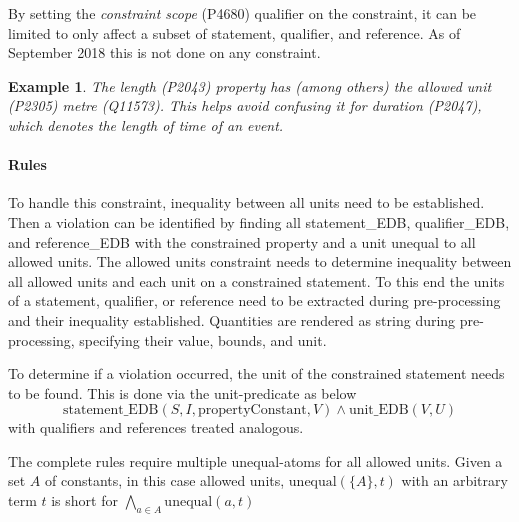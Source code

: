 \documentclass[hyperref,bachelorofscience,fleqn]{cgvpub}
\newtheorem{example}{Example}
\begin{document}
By setting the \emph{constraint scope} (P4680) qualifier on the constraint, it can be limited to only affect a subset of statement, qualifier, and reference. As of September 2018 this is not done on any constraint.

\begin{example}
The \emph{length} (P2043) property has (among others) the \emph{allowed unit} (P2305) \emph{metre} (Q11573). This helps avoid confusing it for \emph{duration} (P2047), which denotes the length of time of an event.
\end{example}

\paragraph{Rules}
To handle this constraint, inequality between all units need to be established. Then a violation can be identified by finding all statement\_EDB, qualifier\_EDB, and reference\_EDB with the constrained property and a unit unequal to all allowed units.
The allowed units constraint needs to determine inequality between all allowed units and each unit on a constrained statement. To this end the units of a statement, qualifier, or reference need to be extracted during pre-processing and their inequality established. Quantities are rendered as string during pre-processing, specifying their value, bounds, and unit.

To determine if a violation occurred, the unit of the constrained statement needs to be found. This is done via the unit-predicate as below
\begin{equation*}
\text{statement\_EDB}(S, I, \text{propertyConstant}, V) \wedge \text{unit\_EDB}(V, U)
\end{equation*}
with qualifiers and references treated analogous.

The complete rules require multiple unequal-atoms for all allowed units. Given a set \(A\) of constants, in this case allowed units, \(\text{unequal}(\{A\}, t)\) with an arbitrary term \(t\) is short for \(\bigwedge_{a \in A} \text{unequal}(a, t)\)
\end{document}
